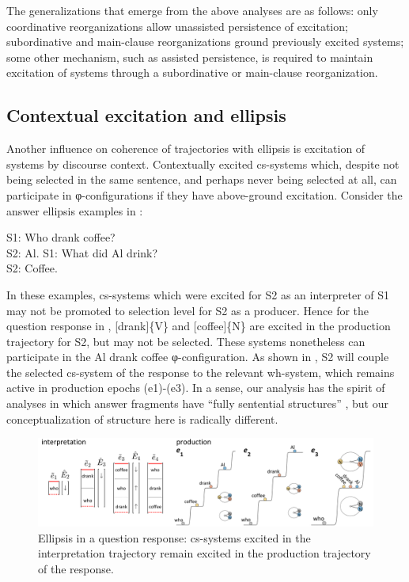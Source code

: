   The generalizations that emerge from the above analyses are as follows: only coordinative reorganizations allow unassisted persistence of excitation; subordinative and main-clause reorganizations ground previously excited systems; some other mechanism, such as assisted persistence, is required to maintain excitation of systems through a subordinative or main-clause reorganization. 

\subsection{Contextual excitation and ellipsis}

Another influence on coherence of trajectories with ellipsis is excitation of systems by discourse context. Contextually excited cs-systems which, despite not being selected in the same sentence, and perhaps never being selected at all, can participate in φ-configurations if they have above-ground excitation. Consider the answer ellipsis examples in :

\ea\label{ex:7:8}
    \ea S1: {Who drank coffee?}\\  S2: {Al}.\label{ex:7:8a}
    \ex S1: {What did Al drink?}\\  S2: {Coffee.}\label{ex:7:8b}
\z
\z

  In these examples, cs-systems which were excited for S2 as an interpreter of S1 may not be promoted to selection level for S2 as a producer. Hence for the question response in , [drank]\{V\} and [coffee]\{N\} are excited in the production trajectory for S2, but may not be selected. These systems nonetheless can participate in the {\textbar}Al drank coffee{\textbar} φ-configuration. As shown in {}, S2 will couple the selected cs-system of the response to the relevant wh-system, which remains active in production epochs (e1)-(e3). In a sense, our analysis has the spirit of analyses in which answer fragments have “fully sentential structures”  \citep{Merchant2005}, but our conceptualization of structure here is radically different.

  
\begin{figure}
\includegraphics[width=\textwidth]{figures/Tilsen-img151.png}
\caption{Ellipsis in a question response: cs-systems excited in the interpretation trajectory remain excited in the production trajectory of the response.}
\label{fig:7:7}
\end{figure}
 

